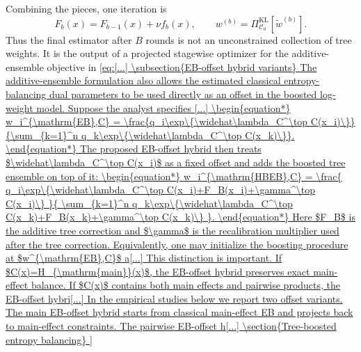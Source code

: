 \documentclass[11pt]{article}
\begin{document}
Combining the pieces, one iteration is
\begin{equation*}
F_b(x)=F_{b-1}(x)+\nu f_b(x),
\qquad
w^{(b)}
=
\Pi_{\mathcal{C}_0}^{\mathrm{KL}}
\left[\widetilde w^{(b)}\right].
\end{equation*}
Thus the final estimator after $B$ rounds is not an unconstrained collection of tree weights. It is the output of a projected stagewise optimizer for the additive-ensemble objective in \eqref{eq:[...]


\subsection{EB-offset hybrid variants}

The additive-ensemble formulation also allows the estimated classical entropy-balancing dual parameters to be used directly as an offset in the boosted log-weight model. Suppose the analyst specifies [...]
\begin{equation*}
w_i^{\mathrm{EB},C}
=
\frac{q_i\exp\{\widehat\lambda_C^\top C(x_i)\}}
{\sum_{k=1}^n q_k\exp\{\widehat\lambda_C^\top C(x_k)\}}.
\end{equation*}
The proposed EB-offset hybrid then treats $\widehat\lambda_C^\top C(x_i)$ as a fixed offset and adds the boosted tree ensemble on top of it:
\begin{equation*}
w_i^{\mathrm{HBEB},C}
=
\frac{
q_i\exp\{\widehat\lambda_C^\top C(x_i)+F_B(x_i)+\gamma^\top C(x_i)\}
}{
\sum_{k=1}^n q_k\exp\{\widehat\lambda_C^\top C(x_k)+F_B(x_k)+\gamma^\top C(x_k)\}
}.
\end{equation*}
Here $F_B$ is the additive tree correction and $\gamma$ is the recalibration multiplier used after the tree correction. Equivalently, one may initialize the boosting procedure at $w^{\mathrm{EB},C}$ a[...] 

This distinction is important. If $C(x)=H_{\mathrm{main}}(x)$, the EB-offset hybrid preserves exact main-effect balance. If $C(x)$ contains both main effects and pairwise products, the EB-offset hybri[...] 

In the empirical studies below we report two offset variants. The main EB-offset hybrid starts from classical main-effect EB and projects back to main-effect constraints. The pairwise EB-offset h[...]

\section{Tree-boosted entropy balancing}

}
\end{document}
